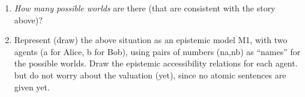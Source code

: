 \documentclass[leqno]{article}
\begin{document}
\begin{enumerate}

    \item \textit{How many possible worlds} are there (that are consistent with the story above)?\\
    \begin{center}
    \end{center}

    \item Represent (draw) the above situation as an epistemic model M1, with two agents (a for Alice, b for Bob),  using pairs of numbers (na,nb) as “names” for the possible worlds. Draw the epistemic accessibility  relations for each agent. but  do
    not worry about the valuation (yet), since no atomic sentences are given yet.\\


\end{enumerate}
\end{document}
